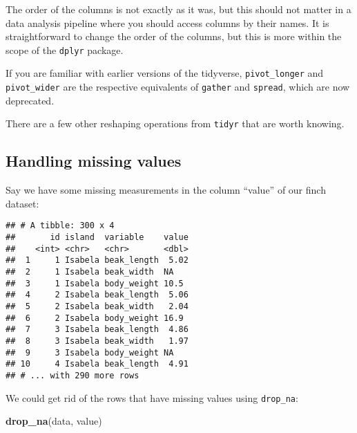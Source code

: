 \documentclass[
]{book}
\newenvironment{Shaded}{}{}
\newcommand{\CommentTok}[1]{\textcolor[rgb]{0.38,0.63,0.69}{\textit{#1}}}
\newcommand{\DecValTok}[1]{\textcolor[rgb]{0.25,0.63,0.44}{#1}}
\newcommand{\KeywordTok}[1]{\textcolor[rgb]{0.00,0.44,0.13}{\textbf{#1}}}
\newcommand{\NormalTok}[1]{#1}
\newcommand{\OperatorTok}[1]{\textcolor[rgb]{0.40,0.40,0.40}{#1}}
\newcommand{\OtherTok}[1]{\textcolor[rgb]{0.00,0.44,0.13}{#1}}
\newcommand{\StringTok}[1]{\textcolor[rgb]{0.25,0.44,0.63}{#1}}
\begin{document}
The order of the columns is not exactly as it was, but this should not matter in a data analysis pipeline where you should access columns by their names. It is straightforward to change the order of the columns, but this is more within the scope of the \texttt{dplyr} package.

If you are familiar with earlier versions of the tidyverse, \texttt{pivot\_longer} and \texttt{pivot\_wider} are the respective equivalents of \texttt{gather} and \texttt{spread}, which are now deprecated.

There are a few other reshaping operations from \texttt{tidyr} that are worth knowing.

\hypertarget{handling-missing-values}{%
\subsection{Handling missing values}\label{handling-missing-values}}

Say we have some missing measurements in the column ``value'' of our finch dataset:

\begin{Shaded}
\end{Shaded}

\begin{verbatim}
## # A tibble: 300 x 4
##       id island  variable    value
##    <int> <chr>   <chr>       <dbl>
##  1     1 Isabela beak_length  5.02
##  2     1 Isabela beak_width  NA   
##  3     1 Isabela body_weight 10.5 
##  4     2 Isabela beak_length  5.06
##  5     2 Isabela beak_width   2.04
##  6     2 Isabela body_weight 16.9 
##  7     3 Isabela beak_length  4.86
##  8     3 Isabela beak_width   1.97
##  9     3 Isabela body_weight NA   
## 10     4 Isabela beak_length  4.91
## # ... with 290 more rows
\end{verbatim}

We could get rid of the rows that have missing values using \texttt{drop\_na}:

\begin{Shaded}
\begin{Highlighting}[]
\KeywordTok{drop_na}\NormalTok{(data, value)}
\end{Highlighting}
\end{Shaded}
\end{document}
